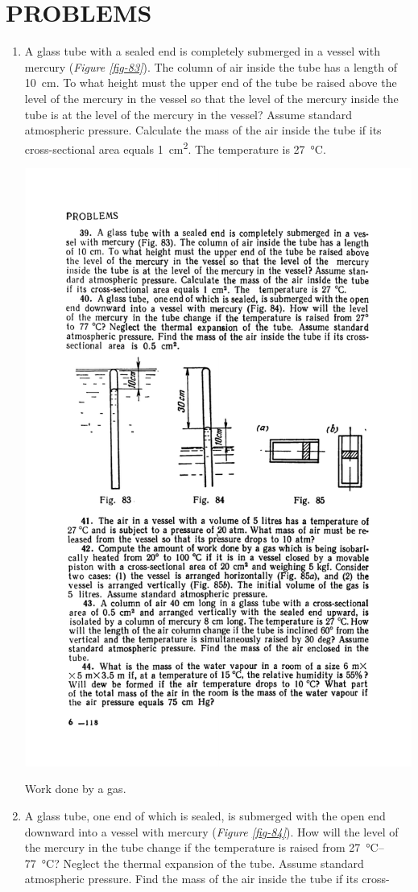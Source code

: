 \documentclass[a4paper,sfsidenotes]{tufte-book}
\begin{document}
\section{PROBLEMS}
\begin{enumerate}[resume=problems]
\item A glass tube with a sealed end is completely submerged in a vessel with mercury (\emph{Figure \ref{fig-83}}). The column of air inside the tube has a length of \SI{10}{\centi\meter}. To what height must the upper end of the tube be raised above the level of the mercury in the vessel so that the level of the mercury inside the tube is at the level of the mercury in the vessel? Assume standard atmospheric pressure. Calculate the mass of the air inside the tube if its cross-sectional area equals  \SI{1}{\centi\meter^{2}}. The temperature is \SI{27}{\degreeCelsius}.
\begin{marginfigure}[-5cm]%
\centering
\includegraphics[width=0.7\linewidth]{fig-083a}
\caption{Work done by a gas.}
\label{fig-83}
\end{marginfigure}
\item A glass tube, one end of which is sealed, is submerged with the open end downward into a vessel with mercury (\emph{Figure \ref{fig-84}}). How will the level of the mercury in the tube change if the temperature is raised from \SIrange{27}{77}{\degreeCelsius}? Neglect the thermal expansion of the tube. Assume standard atmospheric pressure. Find the mass of the air inside the tube if its cross-

\end{enumerate}
\end{document}

